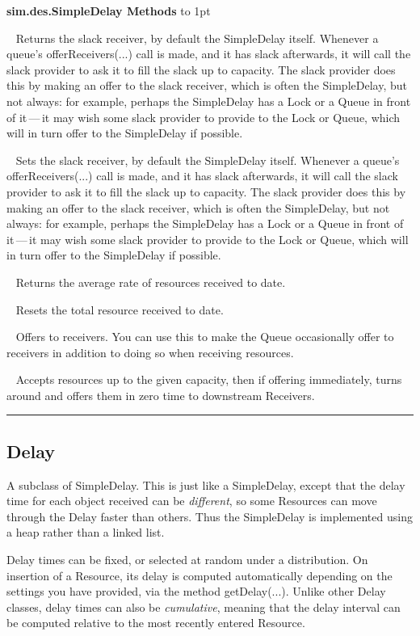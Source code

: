 \documentclass[twoside,10pt]{article}
\newcommand\class[1]{\index{Classes!{#1}}\textsf{#1}}
\newcommand*{\xfill}[1][0pt]{%
	\cleaders
		\hbox to 1pt{\hss
			\raisebox{#1}{\rule{1.2pt}{0.4pt}}%
			\hss}\hfill}
\newenvironment{methods}[1]{
\vspace{1.0em}\noindent\textsf{\textbf{#1 Methods}}\quad \xfill[0.5ex]
\vspace{-0.25em}
\begin{description}
\small}
{\end{description}\hrule\vspace{1.5em}}
\newcommand{\mthd}[1]{\item[{\sf #1}]~\newline}
\begin{document}
\begin{methods}{\class{sim.des.SimpleDelay}}
\mthd{public Receiver getSlackReceiver()}
Returns the slack receiver, by default the SimpleDelay itself.  Whenever a queue's offerReceivers(...) call is made, and it has slack afterwards,
    	it will call the slack provider to ask it to fill the slack up to capacity.  The slack provider does this by making an offer to the slack receiver, which is often the SimpleDelay,
    	but not always: for example, perhaps the SimpleDelay has a Lock or a Queue in front of it\,---\,it may wish some
    	slack provider to provide to the Lock or Queue, which will in turn offer to the SimpleDelay if possible.  

\mthd{public void setSlackReceiver(Receiver provider)}
         Sets the slack receiver, by default the SimpleDelay itself.  Whenever a queue's offerReceivers(...) call is made, and it has slack afterwards,
    	it will call the slack provider to ask it to fill the slack up to capacity.  The slack provider does this by making an offer to the slack receiver, which is often the SimpleDelay,
    	but not always: for example, perhaps the SimpleDelay has a Lock or a Queue in front of it\,---\,it may wish some
    	slack provider to provide to the Lock or Queue, which will in turn offer to the SimpleDelay if possible.

        
\mthd{public double getReceiverResourceRate()}
Returns the average rate of resources received to date.
\mthd{public void reset(SimState state)}
Resets the total resource received to date.
\mthd{public void step(SimState state)}
Offers to receivers.  You can use this to make the Queue occasionally offer to receivers in addition to doing so when receiving resources.
\mthd{public boolean accept(Provider provider, Resource amount, double atLeast, double atMost)}
Accepts resources up to the given capacity, then if offering immediately, turns around and offers them in zero time to downstream Receivers.
\end{methods}

\subsection{Delay}

A subclass of SimpleDelay.  This is just like a SimpleDelay, except that the delay time for each object received can be {\it different}, so some Resources can move through the Delay faster than others.  Thus the SimpleDelay is implemented using a heap rather than a linked list.

Delay times can be fixed, or selected at random under a distribution.  On insertion of a Resource, its delay is computed automatically depending on the settings you have provided, via the method getDelay(...).  Unlike other Delay classes, delay times can also be {\it cumulative}, meaning that the delay interval can be computed relative to the most recently entered Resource.
\end{document}

